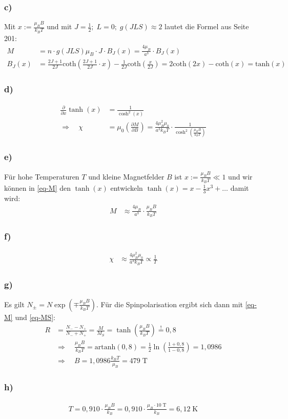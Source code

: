 \subsubsection*{c)} Mit $x := \frac{\mu_B B}{k_B T}$ und mit $J = \frac{1}{2}; \;
L = 0; \; g(JLS) \approx 2$
lautet die Formel aus Seite 201:
\begin{align*}
  M &= n \cdot  g(JLS) \mu_B \cdot J \cdot B_J(x) = \frac{4 \mu_B}{a^3} \cdot B_J(x)\\
  B_J(x) &= \frac{2 J + 1}{2 J} \mathrm{coth}\left(\frac{2 J + 1}{2 J} \cdot x \right) -
  \frac{1}{2 J} \mathrm{coth}\left(\frac{x}{2 J}\right) = 2 \mathrm{coth}(2 x) - \mathrm{coth}(x) = \mathrm{tanh} (x)
\end{align*}

\subsubsection*{d)}
\begin{align*}
  \frac{\partial}{\partial x} \tanh(x) &= \frac{1}{\cosh^2 (x)} \\
  \Rightarrow \quad \chi &= \mu_0 \left(\frac{\partial M}{\partial B}\right) =
  \frac{4 \mu_B^2 \mu_0
  }{a^3 k_B T} \cdot \frac{1}{\cosh^2\left(\frac{\mu_B B}{k_B T}\right)}
\end{align*}

\subsubsection*{e)}
Für hohe Temperaturen $T$ und kleine Magnetfelder $B$ ist $x := \frac{\mu_B B}{k_B T} \ll 1$
und wir können in \eqref{eq-M} den $\tanh(x)$ entwickeln $\tanh(x) = x - \frac{1}{3}x^3 + \dots$ damit wird:
\begin{align*}
  M &\approx \frac{4 \mu_B}{a^3} \cdot \frac{\mu_B B}{k_B T}
\end{align*}
\subsubsection*{f)}
\begin{align*}
  \chi &\approx \frac{4 \mu_B^2 \mu_0}{a^3 k_B T} \propto \frac{1}{T}
\end{align*}

\subsubsection*{g)}
Es gilt $N_\pm = N \exp\left(\mp \frac{\mu_B B}{k_B T}\right)$.
Für die Spinpolarisation ergibt sich dann mit \eqref{eq-M} und \eqref{eq-MS}:
\begin{align*}
  R &=  \frac{N_- - N_+}{N_- + N_+} = \frac{M}{M_S} = \tanh \left(\frac{\mu_B B}{k_B T}\right) \overset{!} = 0{,}8 \\
  & \Rightarrow \quad \frac{\mu_B B}{k_B T} = \mathrm{artanh} (0{,}8) =
  \frac{1}{2} \ln \left(\frac{1 + 0{,}8}{1 - 0{,}8}\right) = 1{,}0986 \\
  & \Rightarrow \quad B = 1{,}0986 \frac{k_B T}{\mu_B} = 479\;\text{T}
\end{align*}

\subsubsection*{h)}
\begin{align*}
  T = 0{,}910 \cdot \frac{\mu_B B}{k_B} = 0{,}910 \cdot \frac{\mu_B \cdot 10\;\text{T} }{k_B}
  = 6{,}12\;\text{K}
\end{align*}
